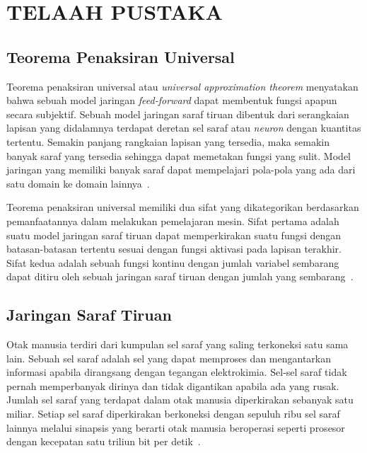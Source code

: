 

\chapter{TELAAH PUSTAKA}
\label{cha:2-TelaahPustaka}

\section{Teorema Penaksiran Universal}
\label{sec:2-TeoremaPenaksiranUniversal}

Teorema penaksiran universal atau \textit{universal approximation theorem} menyatakan bahwa sebuah
model jaringan \textit{feed-forward} dapat membentuk fungsi apapun secara subjektif. Sebuah model
jaringan saraf tiruan dibentuk dari serangkaian lapisan yang didalamnya terdapat deretan sel saraf
atau \textit{neuron} dengan kuantitas tertentu. Semakin panjang rangkaian lapisan yang tersedia,
maka semakin banyak saraf yang tersedia sehingga dapat memetakan fungsi yang sulit.
Model jaringan yang memiliki banyak saraf dapat mempelajari pola-pola yang ada dari satu
domain ke domain lainnya~\cite{2016arXiv160100013G}.

Teorema penaksiran universal memiliki dua sifat yang dikategorikan berdasarkan pemanfaatannya dalam
melakukan pemelajaran mesin. Sifat pertama adalah suatu model jaringan saraf tiruan dapat
memperkirakan suatu fungsi dengan batasan-batasan tertentu sesuai dengan fungsi aktivasi pada
lapisan terakhir. Sifat kedua adalah sebuah fungsi kontinu dengan jumlah variabel sembarang dapat
ditiru oleh sebuah jaringan saraf tiruan dengan jumlah yang sembarang~\cite{2019arXiv191003344K}.

\section{Jaringan Saraf Tiruan}
\label{sec:2-JaringanSarafTiruan}

Otak manusia terdiri dari kumpulan sel saraf yang saling terkoneksi satu sama lain. Sebuah sel saraf
adalah sel yang dapat memproses dan mengantarkan informasi apabila dirangsang dengan tegangan
elektrokimia. Sel-sel saraf tidak pernah memperbanyak dirinya dan tidak digantikan apabila ada yang
rusak. Jumlah sel saraf yang terdapat dalam otak manusia diperkirakan sebanyak satu miliar. Setiap
sel saraf diperkirakan berkoneksi dengan sepuluh ribu sel saraf lainnya melalui sinapsis yang
berarti otak manusia beroperasi seperti prosesor dengan kecepatan satu triliun bit per
detik~\cite{10.3389/neuro.09.031.2009}.

